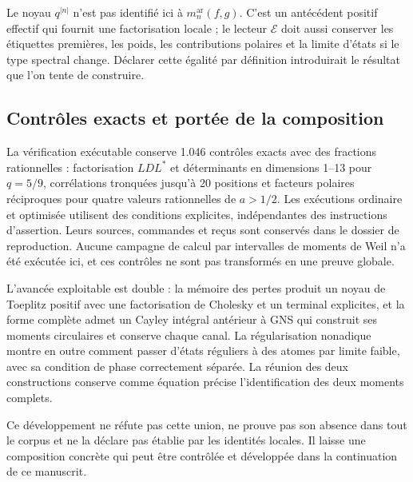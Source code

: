 Le noyau \(q^{|n|}\) n'est pas identifié ici à \(m_n^{\mathrm{ar}}(f,g)\). C'est un antécédent positif effectif qui fournit une factorisation locale ; le lecteur \(\mathcal E\) doit aussi conserver les étiquettes premières, les poids, les contributions polaires et la limite d'états si le type spectral change. Déclarer cette égalité par définition introduirait le résultat que l'on tente de construire.


\subsection{Contrôles exacts et portée de la composition}
\label{tm-add-m8}

% 
La vérification exécutable conserve 1.046 contrôles exacts avec des fractions rationnelles : factorisation \(LDL^*\) et déterminants en dimensions 1–13 pour \(q=5/9\), corrélations tronquées jusqu'à 20 positions et facteurs polaires réciproques pour quatre valeurs rationnelles de \(a>1/2\). Les exécutions ordinaire et optimisée utilisent des conditions explicites, indépendantes des instructions d'assertion. Leurs sources, commandes et reçus sont conservés dans le dossier de reproduction. Aucune campagne de calcul par intervalles de moments de Weil n'a été exécutée ici, et ces contrôles ne sont pas transformés en une preuve globale.

L'avancée exploitable est double : la mémoire des pertes produit un noyau de Toeplitz positif avec une factorisation de Cholesky et un terminal explicites, et la forme complète admet un Cayley intégral antérieur à GNS qui construit ses moments circulaires et conserve chaque canal. La régularisation nonadique montre en outre comment passer d'états réguliers à des atomes par limite faible, avec sa condition de phase correctement séparée. La réunion des deux constructions conserve comme équation précise l'identification des deux moments complets.

Ce développement ne réfute pas cette union, ne prouve pas son absence dans tout le corpus et ne la déclare pas établie par les identités locales. Il laisse une composition concrète qui peut être contrôlée et développée dans la continuation de ce manuscrit.

